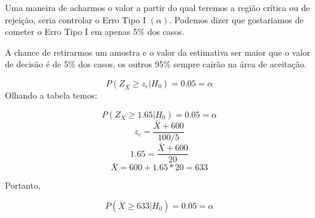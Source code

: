 \documentclass[
  letterpaper,
  DIV=11,
  numbers=noendperiod]{scrreprt}
\begin{document}
Uma maneira de acharmos o valor a partir do qual teremos a região
crítica ou de rejeição, seria controlar o Erro Tipo I \((\alpha)\).
Podemos dizer que gostariamos de cometer o Erro Tipo I em apenas 5\% dos
casos.

\begin{tcolorbox}[enhanced jigsaw, titlerule=0mm, colback=white, coltitle=black, opacityback=0, breakable, colbacktitle=quarto-callout-note-color!10!white, toprule=.15mm, colframe=quarto-callout-note-color-frame, toptitle=1mm, bottomtitle=1mm, opacitybacktitle=0.6, left=2mm, arc=.35mm, rightrule=.15mm, bottomrule=.15mm, leftrule=.75mm, title=\textcolor{quarto-callout-note-color}{\faInfo}\hspace{0.5em}{Erro Estatístico}]

A chance de retirarmos um amostra e o valor da estimativa ser maior que
o valor de decisão é de 5\% dos casos, os outros 95\% sempre cairão na
área de aceitação.

\end{tcolorbox}

\[P(Z_{\bar{X}} \geq z_c|H_0)=0.05= \alpha\] Olhando a tabela temos:

\[P(Z_{\bar{X}} \geq 1.65|H_0)=0.05= \alpha\]
\[z_c =\frac{\bar{X}+600}{100/5}\] \[1.65 = \frac{\bar{X}+600}{20}\]
\[\bar{X}=600+1.65*20=633\]

Portanto,

\[P(\bar{X}\geq 633|H_0)=0.05= \alpha\]
\end{document}

